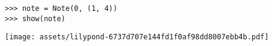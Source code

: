 \begin{comment}
<abjad>
note = Note(0, (1, 4))
show(note)
</abjad>
\end{comment}

\begin{lstlisting}
>>> note = Note(0, (1, 4))
>>> show(note)
\end{lstlisting}
\noindent\texttt{[image: assets/lilypond-6737d707e144fd1f0af98dd8007ebb4b.pdf]}
